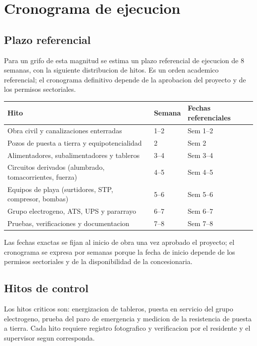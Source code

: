 \chapter{Cronograma de ejecucion}

\section{Plazo referencial}
Para un grifo de esta magnitud se estima un plazo referencial de ejecucion de
8 semanas, con la siguiente distribucion de hitos. Es un orden academico
referencial; el cronograma definitivo depende de la aprobacion del proyecto y
de los permisos sectoriales.

\begin{center}
\begin{tabularx}{\linewidth}{@{}L l l@{}}
\toprule
Hito & Semana & Fechas referenciales \\
\midrule
Obra civil y canalizaciones enterradas & 1--2 & Sem 1--2 \\
Pozos de puesta a tierra y equipotencialidad & 2 & Sem 2 \\
Alimentadores, subalimentadores y tableros & 3--4 & Sem 3--4 \\
Circuitos derivados (alumbrado, tomacorrientes, fuerza) & 4--5 & Sem 4--5 \\
Equipos de playa (surtidores, STP, compresor, bombas) & 5--6 & Sem 5--6 \\
Grupo electrogeno, ATS, UPS y pararrayo & 6--7 & Sem 6--7 \\
Pruebas, verificaciones y documentacion & 7--8 & Sem 7--8 \\
\bottomrule
\end{tabularx}
\end{center}

Las fechas exactas se fijan al inicio de obra una vez aprobado el proyecto; el
cronograma se expresa por semanas porque la fecha de inicio depende de los
permisos sectoriales y de la disponibilidad de la concesionaria.

\section{Hitos de control}
Los hitos criticos son: energizacion de tableros, puesta en servicio del
grupo electrogeno, prueba del paro de emergencia y medicion de la resistencia
de puesta a tierra. Cada hito requiere registro fotografico y verificacion
por el residente y el supervisor segun corresponda.
